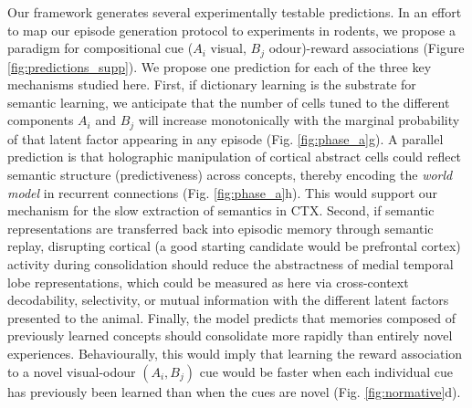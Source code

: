 \documentclass{article}
\begin{document}
\newline\newline
Our framework generates several experimentally testable predictions. In an effort to map our episode generation protocol to experiments in rodents, we propose a paradigm for compositional cue ($A_i$ visual, $B_j$ odour)-reward associations (Figure \ref{fig:predictions_supp}). We propose one prediction for each of the three key mechanisms studied here. First, if dictionary learning is the substrate for semantic learning, we anticipate that the number of cells tuned to the different components $A_i$ and $B_j$ will increase monotonically with the marginal probability of that latent factor appearing in any episode (Fig. \ref{fig:phase_a}g). A parallel prediction is that holographic manipulation of cortical abstract cells could reflect semantic structure (predictiveness) across concepts, thereby encoding the \textit{world model} in recurrent connections (Fig. \ref{fig:phase_a}h). This would support our mechanism for the slow extraction of semantics in CTX. Second, if semantic representations are transferred back into episodic memory through semantic replay, disrupting cortical (a good starting candidate would be prefrontal cortex) activity during consolidation should reduce the abstractness of medial temporal lobe representations, which could be measured as here via cross-context decodability, selectivity, or mutual information with the different latent factors presented to the animal. Finally, the model predicts that memories composed of previously learned concepts should consolidate more rapidly than entirely novel experiences. Behaviourally, this would imply that learning the reward association to a novel visual-odour $(A_i, B_j)$ cue would be faster when each individual cue has previously been learned than when the cues are novel (Fig. \ref{fig:normative}d).
\newline\newline
\end{document}
